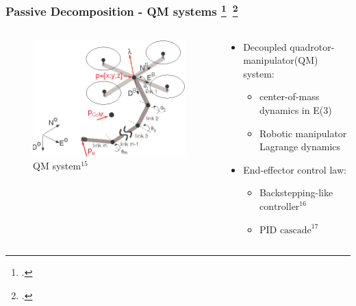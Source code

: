 \begin{frame}
	\frametitle{Passive Decomposition - QM systems \footcite{passive-decomp-quadrotor-with-robotic-manip}$\,$  \footcite{decoupled-aerial-manipulation}}
	
	\begin{columns}
		\begin{column}{0.5\textwidth}\centering
			\begin{figure}[H]
				\includegraphics[width=0.9\columnwidth]{figures/aerial_manip.png}	
				\centering
				\caption{QM system${}^{15}$}
				\label{fig:aerial_manip}
			\end{figure}
		\end{column}
		
		\begin{column}{0.5\textwidth}\centering
			\begin{itemize}
			\item Decoupled quadrotor-manipulator(QM) system:
			\begin{itemize}
				\item center-of-mass dynamics in E(3)
				\item Robotic manipulator Lagrange dynamics
			\end{itemize}
			\item End-effector control law:
			\begin{itemize}
				\item Backstepping-like $\text{controller}^{16}$
				\item PID $\text{cascade}^{17}$
			\end{itemize}
			\end{itemize}
		\end{column}
	\end{columns}
 \end{frame}

